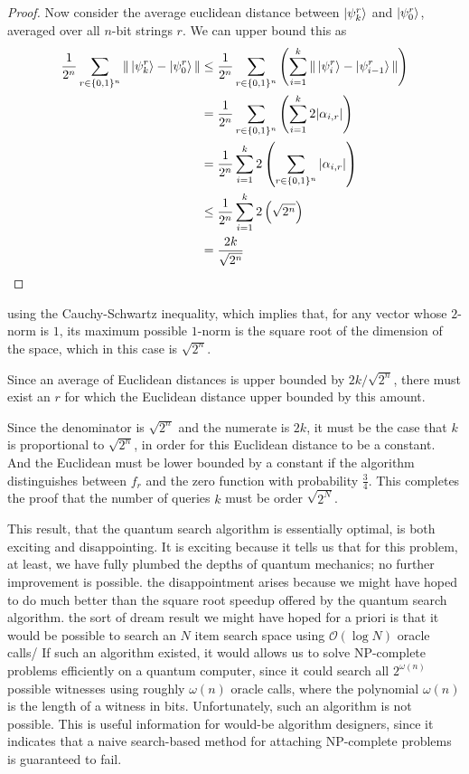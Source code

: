 \begin{proof}
    Now consider the average euclidean distance between $\ket{\psi_k^r}$ and $\ket{\psi_0^r}$, averaged over all $n$-bit strings $r$. We can upper bound this as
    \begin{align*}
    \frac{1}{2^n} \sum_{r\in\{0,1\}^n} \|\ket{\psi_k^r}-\ket{\psi_0^r}\|&\leq \frac{1}{2^n} \sum_{r\in\{0,1\}^n} \left(\sum_{i=1}^k \|\ket{\psi_i^r}-\ket{\psi_{i-1}^r}\|\right)\\
    &=\frac{1}{2^n} \sum_{r\in\{0,1\}^n} \left(\sum_{i=1}^k 2|\alpha_{i,r}| \right)\\
    &=\frac{1}{2^n} \sum_{i=1}^k 2\left(\sum_{r\in\{0,1\}^n} |\alpha_{i,r}|\right)\\
    &\leq \frac{1}{2^n} \sum_{i=1}^k 2\left(\sqrt{2^n}\right)\\
    &=\frac{2k}{\sqrt{2^n}}
    \end{align*}
\end{proof}
using the Cauchy-Schwartz inequality, which implies that, for any vector whose $2$- norm is $1$, its maximum possible $1$-norm is the square root of the dimension of the space, which in this case is $\sqrt{2^n}$.

Since an average of Euclidean distances is upper bounded by $2k/\sqrt{2^n}$, there must exist an $r$ for which the Euclidean distance upper bounded by this amount.

Since the denominator is $\sqrt{2^n}$ and the numerate is $2k$, it must be the case that $k$ is proportional to $\sqrt{2^n}$, in order for this Euclidean distance to be a constant. And the Euclidean must be lower bounded by a constant if the algorithm distinguishes between $f_r$ and the zero function with probability $\frac{3}{4}$. This completes the proof that the number of queries $k$ must be order $\sqrt{2^N}$.

This result, that the quantum search algorithm is essentially optimal, is both exciting and disappointing. It is exciting because it tells us that for this problem, at least, we have fully plumbed the depths of quantum mechanics; no further improvement is possible. the disappointment arises because we might have hoped to do much better than the square root speedup offered by the quantum search algorithm. the sort of dream result we might have hoped for a priori is that it would be possible to search an $N$ item search space using $\mathcal{O}(\log N)$ oracle calls/ If such an algorithm existed, it would allows us to solve NP-complete problems efficiently on a quantum computer, since it could search all $2^{\omega(n)}$ possible witnesses using roughly $\omega(n)$ oracle calls, where the polynomial $\omega(n)$ is the length of a witness in bits. Unfortunately, such an algorithm is not possible. This is useful information for would-be algorithm designers, since it indicates that a naive search-based method for attaching NP-complete problems is guaranteed to fail.

